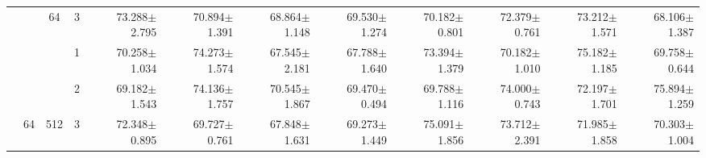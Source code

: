 \begin{table}[htpb]
{\begin{tabular}{c|c|c|c|rr|rr|rr|rr}
                                 &                                                                                 & \multirow{-3}{*}{64}                                                                   & 3                                                                                         & 73.288$\pm$2.795                        & 70.894$\pm$1.391                        & 68.864$\pm$1.148                        & 69.530$\pm$1.274                        & 70.182$\pm$0.801                        & 72.379$\pm$0.761                        & 73.212$\pm$1.571                        & 68.106$\pm$1.387                       \\ \cline{3-12} 
                                 &                                                                                 &                                                                                        & 1                                                                                         & 70.258$\pm$1.034                        & 74.273$\pm$1.574                        & 67.545$\pm$2.181                        & 67.788$\pm$1.640                        & 73.394$\pm$1.379                        & 70.182$\pm$1.010                        & 75.182$\pm$1.185                        & 69.758$\pm$0.644                       \\
                                 &                                                                                 &                                                                                        & 2                                                                                         & 69.182$\pm$1.543                        & 74.136$\pm$1.757                        & 70.545$\pm$1.867                        & 69.470$\pm$0.494                        & 69.788$\pm$1.116                        & 74.000$\pm$0.743                        & 72.197$\pm$1.701                        & 75.894$\pm$1.259                       \\
                                 & \multirow{-6}{*}{64}                                                            & \multirow{-3}{*}{512}                                                                  & 3                                                                                         & 72.348$\pm$0.895                        & 69.727$\pm$0.761                        & 67.848$\pm$1.631                        & 69.273$\pm$1.449                        & 75.091$\pm$1.856                        & 73.712$\pm$2.391                        & 71.985$\pm$1.858                        & 70.303$\pm$1.004                       \\ \cline{2-12} 

\end{tabular}}
\end{table}
